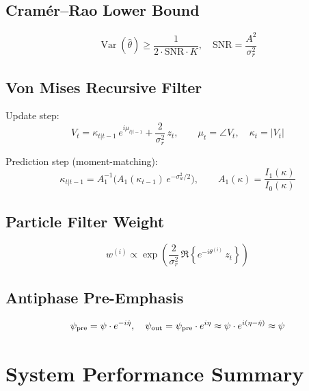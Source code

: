 \documentclass[12pt, a4paper]{article}
\newcommand{\SNR}{\mathrm{SNR}}
\begin{document}
\subsection{Cramér–Rao Lower Bound}

\begin{equation}\label{eq:crlb}
  \operatorname{Var}(\hat{\theta}) \geq \frac{1}{2 \cdot \SNR \cdot K},
  \quad \SNR = \frac{A^2}{\sigma_r^2}
\end{equation}

\subsection{Von Mises Recursive Filter}

Update step:
\begin{equation}\label{eq:vm_update}
  V_t = \kappa_{t|t-1}\,e^{i\mu_{t|t-1}}
        + \frac{2}{\sigma_r^2}\,z_t,
  \qquad
  \mu_t = \angle V_t, \quad \kappa_t = |V_t|
\end{equation}

Prediction step (moment-matching):
\begin{equation}\label{eq:vm_predict}
  \kappa_{t|t-1} = A_1^{-1}\!\bigl(A_1(\kappa_{t-1})\,e^{-\sigma_w^2/2}\bigr),
  \qquad A_1(\kappa) = \frac{I_1(\kappa)}{I_0(\kappa)}
\end{equation}

\subsection{Particle Filter Weight}

\begin{equation}\label{eq:pf_weight}
  w^{(i)} \propto
  \exp\!\left(\frac{2}{\sigma_r^2}\,\Re\!\left\{e^{-i\theta^{(i)}}\,z_t\right\}\right)
\end{equation}

\subsection{Antiphase Pre-Emphasis}

\begin{equation}\label{eq:preemphasis}
  \psi_{\rm pre} = \psi \cdot e^{-i\hat{\eta}},
  \quad
  \psi_{\rm out} = \psi_{\rm pre} \cdot e^{i\eta}
  \approx \psi \cdot e^{i(\eta - \hat{\eta})} \approx \psi
\end{equation}

\section{System Performance Summary}
\end{document}
